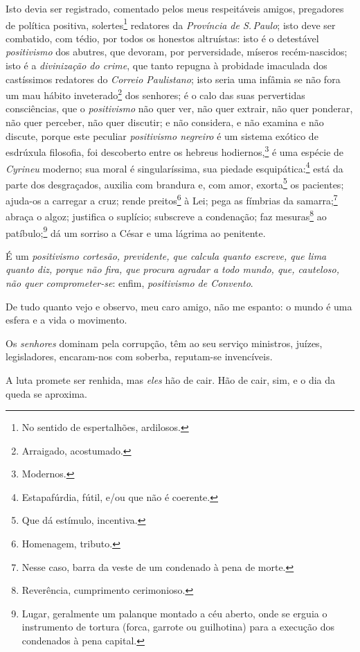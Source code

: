 Isto devia ser registrado, comentado pelos meus respeitáveis amigos,
pregadores de política positiva, solertes\footnote{No sentido de
  espertalhões, ardilosos.} redatores da \emph{Província de S.\,Paulo};
isto deve ser combatido, com tédio, por todos os honestos altruístas:
isto é o detestável \emph{positivismo} dos abutres, que devoram, por
perversidade, míseros recém-nascidos; isto é a \emph{divinização do
crime}, que tanto repugna à probidade imaculada dos castíssimos
redatores do \emph{Correio Paulistano}; isto seria uma infâmia se não
fora um mau hábito inveterado\footnote{Arraigado, acostumado.} dos
senhores; é o calo das suas pervertidas consciências, que o
\emph{positivismo} não quer ver, não quer extrair, não quer ponderar,
não quer perceber, não quer discutir; e não considera, e não examina e
não discute, porque este peculiar \emph{positivismo negreiro} é um
sistema exótico de esdrúxula filosofia, foi descoberto entre os hebreus
hodiernos,\footnote{Modernos.} é uma espécie de \emph{Cyrineu} 
moderno; sua moral é singularíssima, sua piedade esquipática:\footnote{
  Estapafúrdia, fútil, e/ou que não é coerente.} está da parte dos
desgraçados, auxilia com brandura e, com amor, exorta\footnote{Que dá
  estímulo, incentiva.} os pacientes; ajuda-os a carregar a cruz; rende
preitos\footnote{Homenagem, tributo.} à Lei; pega as fímbrias da
samarra;\footnote{Nesse caso, barra da veste de um condenado à pena de
  morte.} abraça o algoz; justifica o suplício; subscreve a condenação;
faz mesuras\footnote{Reverência, cumprimento cerimonioso.} ao
patíbulo;\footnote{Lugar, geralmente um palanque montado a céu aberto,
  onde se erguia o instrumento de tortura (forca, garrote ou guilhotina)
  para a execução dos condenados à pena capital.}
dá um sorriso a César e uma
lágrima ao penitente.

É um \emph{positivismo cortesão, previdente, que calcula quanto escreve,
que lima quanto diz, porque não fira, que procura agradar a todo mundo,
que, cauteloso, não quer comprometer-se}: enfim, \emph{positivismo de
Convento}.

De tudo quanto vejo e observo, meu caro amigo, não me espanto: o mundo é
uma esfera e a vida o movimento.

Os \emph{senhores} dominam pela corrupção, têm ao seu serviço ministros,
juízes, legisladores, encaram-nos com soberba, reputam-se invencíveis.

A luta promete ser renhida, mas \emph{eles} hão de cair. Hão de cair,
sim, e o dia da queda se aproxima.

